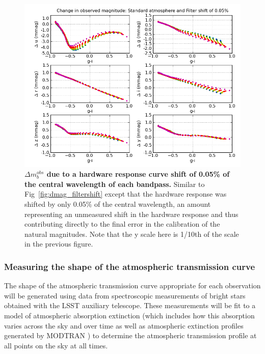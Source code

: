 \documentclass[12pt,preprint]{aastex}
\begin{document}
\begin{figure}
\centering
\includegraphics[width=6in]{delta_mags_filtershift_small}
\caption{{\small 
{\bf $\Delta m_b^{obs}$ due to a hardware
response curve shift of 0.05\% of the central wavelength of each
bandpass.} Similar to Fig~\ref{fig:dmag_filtershift} except that the
hardware response was shifted by only 0.05\% of the central
wavelength, an amount representing an unmeasured shift in the hardware
response and thus contributing directly to the final error in the
calibration of the natural magnitudes. Note that the y scale here is 1/10th
of the scale in the previous figure. }}
\label{fig:dmag_filtershift_small} 
\end{figure}
 

\subsubsection{Measuring the shape of the atmospheric transmission curve}
\label{sec:phi_atmo}

The shape of the atmospheric transmission curve appropriate for each observation
will be generated using data from spectroscopic measurements of bright
stars obtained with the LSST auxiliary telescope. These measurements
will be fit to a model of atmospheric absorption extinction (which includes
how this absorption varies across the sky and over time as well as
atmospheric extinction profiles generated by MODTRAN \citep{modtran4a,
  modtran4b}) to determine
the atmospheric transmission profile at all points on the sky at all
times. 
\end{document}
